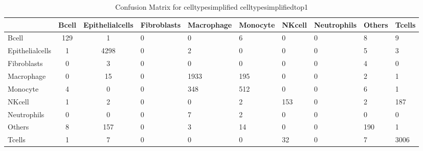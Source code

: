 \begin{table}[htbp]
\centering
\caption{Confusion Matrix for celltypesimplified celltypesimplifiedtop1}
\label{tab:confusionmatrix.celltypesimplified.celltypesimplifiedtop1}
\begin{tabular}{|l|cc|}
\toprule
 & Bcell & Epithelialcells & Fibroblasts & Macrophage & Monocyte & NKcell & Neutrophils & Others & Tcells \\
\midrule
Bcell & 129 & 1 & 0 & 0 & 6 & 0 & 0 & 8 & 9 \\
Epithelialcells & 1 & 4298 & 0 & 2 & 0 & 0 & 0 & 5 & 3 \\
Fibroblasts & 0 & 3 & 0 & 0 & 0 & 0 & 0 & 4 & 0 \\
Macrophage & 0 & 15 & 0 & 1933 & 195 & 0 & 0 & 2 & 1 \\
Monocyte & 4 & 0 & 0 & 348 & 512 & 0 & 0 & 6 & 1 \\
NKcell & 1 & 2 & 0 & 0 & 2 & 153 & 0 & 2 & 187 \\
Neutrophils & 0 & 0 & 0 & 7 & 2 & 0 & 0 & 0 & 0 \\
Others & 8 & 157 & 0 & 3 & 14 & 0 & 0 & 190 & 1 \\
Tcells & 1 & 7 & 0 & 0 & 0 & 32 & 0 & 7 & 3006 \\
\bottomrule
\end{tabular}
\end{table}
